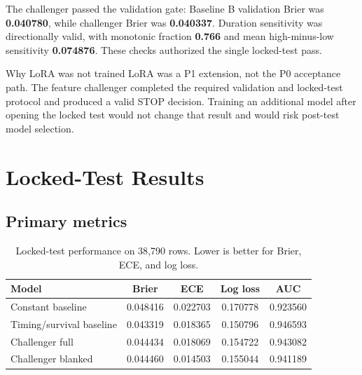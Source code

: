 \documentclass[10pt,a4paper]{article}
\newcommand{\metric}[1]{\textbf{\color{Ink}#1}}
\begin{document}
The challenger passed the validation gate: Baseline B validation Brier was
\metric{0.040780}, while challenger Brier was \metric{0.040337}. Duration
sensitivity was directionally valid, with monotonic fraction \metric{0.766} and
mean high-minus-low sensitivity \metric{0.074876}. These checks authorized the
single locked-test pass.

\begin{insightbox}{Why LoRA was not trained}
LoRA was a P1 extension, not the P0 acceptance path. The feature challenger
completed the required validation and locked-test protocol and produced a valid
STOP decision. Training an additional model after opening the locked test would
not change that result and would risk post-test model selection.
\end{insightbox}

\clearpage
\section{Locked-Test Results}

\subsection{Primary metrics}
\begin{table}[H]
  \centering
  \caption{Locked-test performance on 38,790 rows. Lower is better for Brier, ECE, and log loss.}
  \small
  \begin{tabular}{@{}l
    S[table-format=1.6]
    S[table-format=1.6]
    S[table-format=1.6]
    S[table-format=1.6]@{}}
    \toprule
    \textbf{Model} & {\textbf{Brier}} & {\textbf{ECE}} &
    {\textbf{Log loss}} & {\textbf{AUC}}\\
    \midrule
    Constant baseline & 0.048416 & 0.022703 & 0.170778 & 0.923560\\
    Timing/survival baseline & 0.043319 & 0.018365 & 0.150796 & 0.946593\\
    Challenger full & 0.044434 & 0.018069 & 0.154722 & 0.943082\\
    Challenger blanked & 0.044460 & 0.014503 & 0.155044 & 0.941189\\
    \bottomrule
  \end{tabular}
\end{table}
\end{document}
